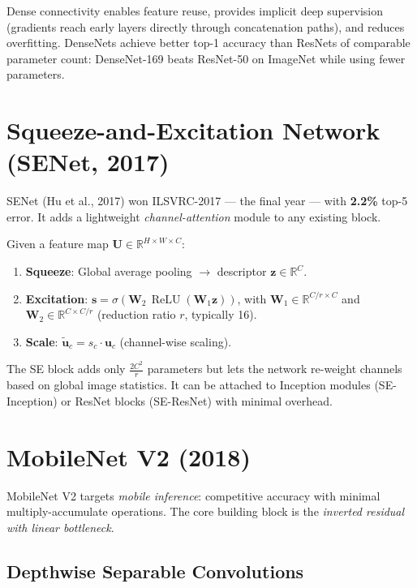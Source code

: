 \documentclass[11pt, oneside]{book}
\newcommand{\R}{\mathbb{R}}
\DeclareMathOperator{\relu}{ReLU}
\begin{document}
Dense connectivity enables feature reuse, provides implicit deep supervision
(gradients reach early layers directly through concatenation paths),
and reduces overfitting.
DenseNets achieve better top-1 accuracy than ResNets of comparable parameter count:
DenseNet-169 beats ResNet-50 on ImageNet while using fewer parameters.

\section{Squeeze-and-Excitation Network (SENet, 2017)}

SENet (Hu et al., 2017) won ILSVRC-2017 — the final year — with \textbf{2.2\%} top-5 error.
It adds a lightweight \emph{channel-attention} module to any existing block.

\begin{defbox}[title={SE Block}]
Given a feature map $\mathbf{U} \in \R^{H \times W \times C}$:
\begin{enumerate}
  \item \textbf{Squeeze}: Global average pooling $\to$ descriptor $\mathbf{z} \in \R^C$.
  \item \textbf{Excitation}: $\mathbf{s} = \sigma\!\left(\mathbf{W}_2\,\relu(\mathbf{W}_1\mathbf{z})\right)$,
        with $\mathbf{W}_1 \in \R^{C/r \times C}$ and $\mathbf{W}_2 \in \R^{C \times C/r}$
        (reduction ratio $r$, typically 16).
  \item \textbf{Scale}: $\widetilde{\mathbf{u}}_c = s_c \cdot \mathbf{u}_c$ (channel-wise scaling).
\end{enumerate}
\end{defbox}

The SE block adds only $\frac{2C^2}{r}$ parameters but lets the network
re-weight channels based on global image statistics.
It can be attached to Inception modules (SE-Inception) or ResNet blocks (SE-ResNet)
with minimal overhead.

\section{MobileNet V2 (2018)}

MobileNet V2 targets \emph{mobile inference}: competitive accuracy with minimal
multiply-accumulate operations.
The core building block is the \emph{inverted residual with linear bottleneck}.

\subsection{Depthwise Separable Convolutions}
\end{document}
